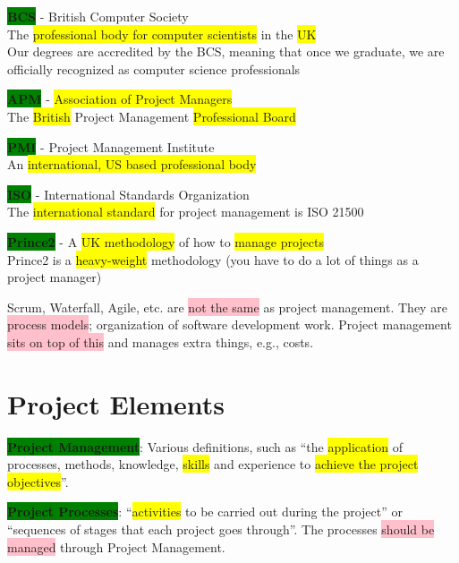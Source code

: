 \documentclass[]{project_plan}
\begin{document}
\colorbox{green}{\textbf{BCS}} - British Computer Society\\
The \colorbox{yellow}{professional body for computer scientists} in the \colorbox{yellow}{UK}\\
Our degrees are accredited by the BCS, meaning that once we graduate, we are
officially recognized as computer science professionals

\colorbox{green}{\textbf{APM}} - \colorbox{yellow}{Association of Project Managers}\\
The \colorbox{yellow}{British} Project Management \colorbox{yellow}{Professional Board}

\colorbox{green}{\textbf{PMI}} - Project Management Institute\\
An \colorbox{yellow}{international, US based professional body}

\colorbox{green}{\textbf{ISO}} - International Standards Organization\\
The \colorbox{yellow}{international standard} for project management is ISO 21500

\colorbox{green}{\textbf{Prince2}} - A \colorbox{yellow}{UK methodology} of how to \colorbox{yellow}{manage projects}\\
Prince2 is a \colorbox{yellow}{heavy-weight} methodology (you have to do a lot of things as a project manager)

Scrum, Waterfall, Agile, etc. are \colorbox{pink}{not the same} as project management. They are
\colorbox{pink}{process models}; organization of software development work. Project management
\colorbox{pink}{sits on top of this} and manages extra things, e.g., costs.

\newpage

\section{Project Elements}

\colorbox{green}{\textbf{Project Management}}: Various definitions, such as “the \colorbox{yellow}{application} of
processes, methods, knowledge, \colorbox{yellow}{skills} and experience to \colorbox{yellow}{achieve
  the project objectives}”.

\colorbox{green}{\textbf{Project Processes}}: “\colorbox{yellow}{activities} to be carried out during the project” or
“sequences of stages that each project goes through”. The processes
\colorbox{pink}{should be managed} through Project Management.
\end{document}
